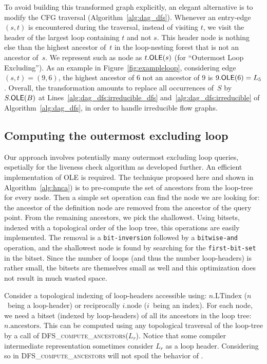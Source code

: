 To avoid building this transformed graph explicitly, an elegant alternative is to modify the CFG traversal (Algorithm~\ref{alg:dag_dfs}).
Whenever an entry-edge $(s,t)$ is encountered during the traversal, instead of visiting $t$, we visit the header of the largest loop containing $t$ and not $s$.
This header node is nothing else than the highest ancestor of~$t$ in the loop-nesting forest that is not an ancestor of~$s$.
We represent such as node as $t.\textsf{OLE}(s)$ (for ``Outermost Loop Excluding'').
As an example in Figure~\ref{fig:exampleloop}, considering edge $(s,t)=(9,6)$, the highest ancestor of $6$ not an ancestor of $9$ is $9.\textsf{OLE}(6)=L_5$. 
Overall, the transformation amounts to replace all occurrences of~$S$ by $S.\textsf{OLE}(B)$ at Lines~\ref{alg:dag_dfs:irreducible_dfs} and~\ref{alg:dag_dfs:irreducible} of Algorithm~\ref{alg:dag_dfs}, in order to handle irreducible flow graphs.


\newcommand{\couple}[2]{\langle#1,#2\rangle}
\def\sep{,$ $}

\subsection{Computing the outermost excluding loop}
\label{sec:ole}
Our approach involves potentially many outermost excluding loop queries, espetially for the liveness check algorithm as developed further.
An efficient implementation of \textsf{OLE} is required.
The technique proposed here and shown in Algorithm~\ref{alg:hnca}) is to pre-compute the set of ancestors from the loop-tree for every node.
Then a simple set operation can find the node we are looking for:
the ancestor of the definition node are removed from the ancestor of the query point.
From the remaining ancestors, we pick the shallowest.
Using bitsets, indexed with a topological order of the loop tree, this operations are easily implemented.
The removal is a \texttt{bit-inversion} followed by a \texttt{bitwise-and} operation, and the shallowest node is found by searching for the \texttt{first-bit-set} in the bitset.
Since the number of loops (and thus the number loop-headers) is rather small, the bitsets are themselves small as well and this optimization does not result in much wasted space.

Consider a topological indexing of loop-headers accessible using:
$n.\textrm{LTindex}$ ($n$~being a loop-header) or reciprocally $i.\textrm{node}$ ($i$~being an index).
For each node, we need a bitset (indexed by loop-headers) of all its ancestors in the loop tree:
$n.\textrm{ancestors}$.
This can be computed using any topological traversal of the loop-tree by a call of \textsc{DFS\_compute\_ancestors}($L_r$).
Notice that some compiler intermediate representation sometimes consider $L_r$ as a loop header.
Considering so in \textsc{DFS\_compute\_ancestors} will not spoil the behavior of \@OLE.

